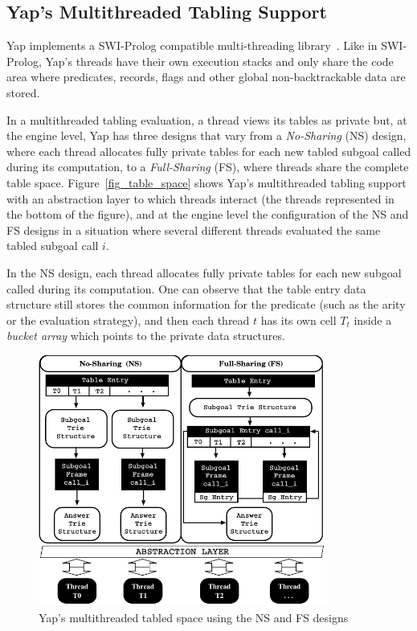 \documentclass{llncs}
\begin{document}
\subsection{Yap's Multithreaded Tabling Support}

Yap implements a SWI-Prolog compatible multi-threading
library~\cite{Wielemaker-03}. Like in SWI-Prolog, Yap's threads have
their own execution stacks and only share the code area where
predicates, records, flags and other global non-backtrackable data are
stored. 

In a multithreaded tabling evaluation, a thread views its tables as
private but, at the engine level, Yap has three designs that vary from
a \emph{No-Sharing} (NS) design, where each thread allocates fully
private tables for each new tabled subgoal called during its
computation, to a \emph{Full-Sharing} (FS), where threads share the
complete table space. Figure~\ref{fig_table_space} shows Yap's
multithreaded tabling support with an abstraction layer to which
threads interact (the threads represented in the bottom of the
figure), and at the engine level the configuration of the NS and FS
designs in a situation where several different threads evaluated the
same tabled subgoal call $i$. 

In the NS design, each thread allocates fully private tables for each
new subgoal called during its computation. One can observe that the
table entry data structure still stores the common information for the
predicate (such as the arity or the evaluation strategy), and then
each thread $t$ has its own cell $T_t$ inside a \emph{bucket array}
which points to the private data structures.

\begin{figure}[!ht]
\centering
\includegraphics[width=9.5cm]{figures/yap-mt.pdf}
\caption{Yap's multithreaded tabled space using the NS and FS designs}
\label{fig_yap_mt_support}
\end{figure}
\end{document}
